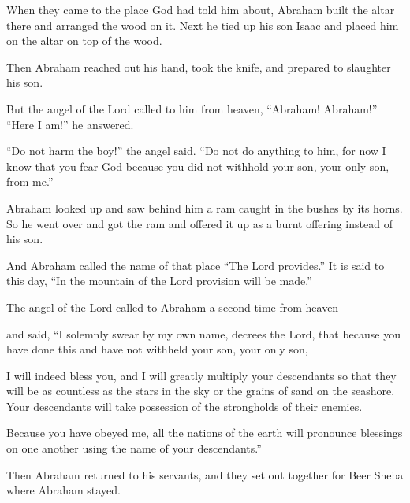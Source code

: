 \begin{scripture}
 When they came to the place God had told him about, Abraham built the altar there and arranged the wood on it. Next he tied up his son Isaac and placed him on the altar on top of the wood.
 Then Abraham reached out his hand, took the knife, and prepared to slaughter his son.
 But the angel of the Lord called to him from heaven, ``Abraham! Abraham!'' ``Here I am!'' he answered.
 ``Do not harm the boy!'' the angel said. ``Do not do anything to him, for now I know that you fear God because you did not withhold your son, your only son, from me.''
\everypar{}

 Abraham looked up and saw behind him a ram caught in the bushes by its horns. So he went over and got the ram and offered it up as a burnt offering instead of his son.
 And Abraham called the name of that place ``The Lord provides.'' It is said to this day, ``In the mountain of the Lord provision will be made.''
\everypar{}

 The angel of the Lord called to Abraham a second time from heaven
 and said, ``I solemnly swear by my own name, decrees the Lord, that because you have done this and have not withheld your son, your only son,
 I will indeed bless you, and I will greatly multiply your descendants so that they will be as countless as the stars in the sky or the grains of sand on the seashore. Your descendants will take possession of the strongholds of their enemies.
 Because you have obeyed me, all the nations of the earth will pronounce blessings on one another using the name of your descendants.''
\everypar{}

 Then Abraham returned to his servants, and they set out together for Beer Sheba where Abraham stayed.
\everypar{}


\end{scripture}
